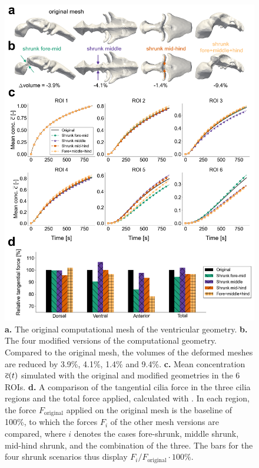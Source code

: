 \documentclass{WileyMSP-template}
\begin{document}
\begin{figure}[H]
    \centering
    \includegraphics[width=\textwidth]{graphics/figure6_compare_modified_geometries.png}
    \caption{\textbf{a.} The original computational mesh of the ventricular geometry.
    \textbf{b.} The four modified versions of the computational geometry. Compared
    to the original mesh, the volumes of the deformed meshes are reduced by 3.9\%, 4.1\%, 1.4\% 
    and 9.4\%.
    \textbf{c.} Mean concentration $\overline{c}(t)$ simulated with the original and modified geometries
    in the 6 ROIs.
    \textbf{d.} A comparison of the tangential cilia force in the three cilia regions
    and the total force applied, calculated with .
    In each region, the force $F_{\mathrm{original}}$ 
    applied on the original mesh is the baseline of 100\%,
    to which the forces $F_i$ of the other mesh versions are compared, where $i$ denotes
    the cases fore-shrunk, middle shrunk, mid-hind shrunk, and the combination of the three.
    The bars for the four shrunk scenarios thus
    display $F_i/F_{\mathrm{original}}\cdot 100\%$.}
    \label{fig:fig6}
\end{figure}
\end{document}

